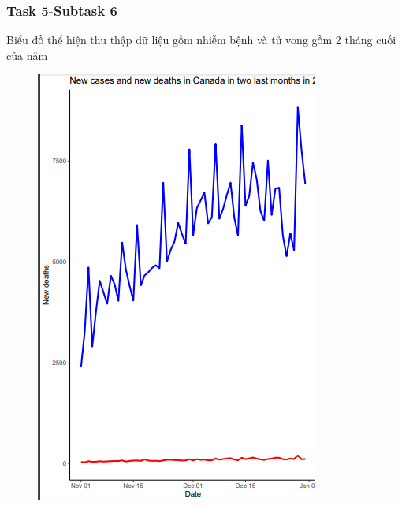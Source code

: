 \documentclass[english,10pt,table]{beamer}
\begin{document}
\frame
{
    \frametitle{Task 5-Subtask 6}
    \begin{block}{Biểu đồ thể hiện thu thập dữ liệu gồm nhiễm bệnh và tử vong gồm 2 tháng cuối của năm}
    \begin{figure}[H]
		\centering
		\includegraphics[scale=0.5]{images/5.6.1.png}
	\end{figure}
    \end{block}
}
\frame
\end{document}
